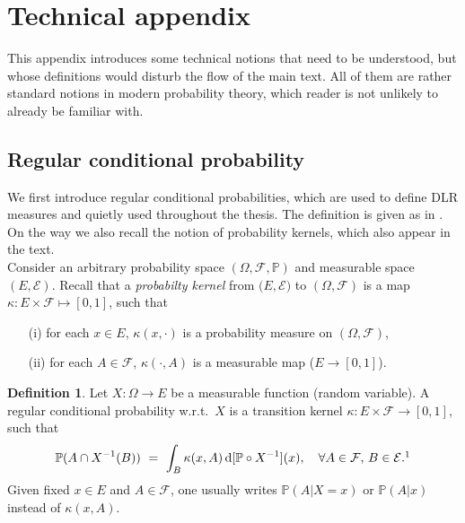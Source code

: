 \documentclass[12pt]{article}
\renewcommand{\d}{\mathrm{d}}
\newcommand{\F}{\mathcal{F}}
\renewcommand{\P}{\mathbb{P}}
\newcommand{\set}[1]{\left\{#1\right\}}
\newcommand{\ra}{\rightarrow}
\newcommand{\pika}{\boldsymbol{\cdot}}
\newcommand{\1}{\mathbbm{1}}
\newcommand{\5}{\vspace{0.5cm}}
\theoremstyle{definition}
\newtheorem{df}[thm]{Definition}
\begin{document}
\pagebreak




\appendix

\section{Technical appendix}

This appendix introduces some technical notions that need to be understood, but whose definitions would disturb the flow of the main text. All of them are rather standard notions in modern probability theory, which reader is not unlikely to already be familiar with.


\subsection{Regular conditional probability}\label{app:1}

We first introduce regular conditional probabilities, which are used to define DLR measures and quietly used throughout the thesis. The definition is given as in \cite{LFR}. On the way we also recall the notion of probability kernels, which also appear in the text. \\

Consider an arbitrary probability space $(\Omega,\F,\P)$ and measurable space $(E,\mathcal{E})$. Recall that a \textit{probabilty kernel} from $(E,\mathcal{E)}$ to $(\Omega,\F)$ is a map $\kappa:E\times\F\mapsto[0,1]$, such that
\begin{itemize}
	\item[(i)] for each $x\in E$, $\kappa(x,\pika)$ is a probability measure on $(\Omega,\F)$,
	\item[(ii)] for each $A\in\F$, $\kappa(\pika,A)$ is a measurable map ($E\ra[0,1]$).
\end{itemize}

\begin{df}
Let $X:\Omega\ra E$ be a measurable function (random variable). A regular conditional probability w.r.t.~$X$ is a transition kernel $\kappa:E\times\F\ra[0,1]$, such that
$$\P(A\cap X^{-1}(B)) ~=~ \int_B \kappa(x,A)\,\d[\P\circ X^{-1}](x), \quad \forall A\in\F,\,B\in\mathcal{E}.\footnote{Instead of $\P(A\cap X^{-1}(B))$, one could also write $\P(A\cap\set{X\in B)}$ or $\P(A~\text{and}~X\in B)$.}$$ 
Given fixed $x\in E$ and $A\in\F$, one usually writes $\P(A|X=x)$ or $\P(A|x)$ instead of $\kappa(x,A)$.
\end{df}
\end{document}
